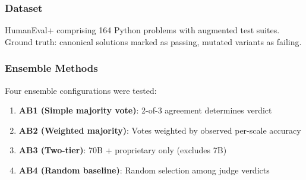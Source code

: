 
\subsubsection{Dataset}

HumanEval+ comprising 164 Python problems with augmented test suites. Ground truth: canonical solutions marked as passing, mutated variants as failing.

\subsubsection{Ensemble Methods}

Four ensemble configurations were tested:

\begin{enumerate}
\item \textbf{AB1 (Simple majority vote)}: 2-of-3 agreement determines verdict
\item \textbf{AB2 (Weighted majority)}: Votes weighted by observed per-scale accuracy
\item \textbf{AB3 (Two-tier)}: 70B + proprietary only (excludes 7B)
\item \textbf{AB4 (Random baseline)}: Random selection among judge verdicts
\end{enumerate}

